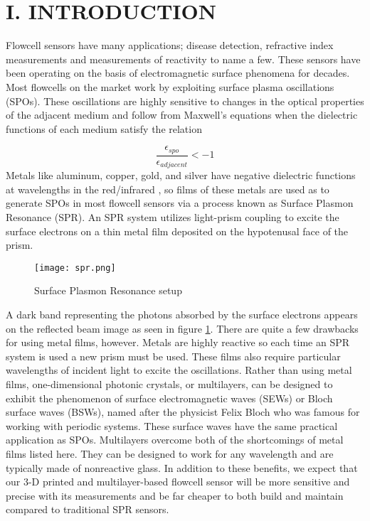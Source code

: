 \selectfont
{}
\section*{I. INTRODUCTION}
\begin{flushleft}
	\hspace{0.25in}
	Flowcell sensors have many applications; disease detection, refractive index measurements and measurements of reactivity to name a few. These sensors have been operating on the basis of electromagnetic surface phenomena for decades. Most flowcells on the market work by exploiting surface plasma oscillations (SPOs). These oscillations are highly sensitive to changes in the optical properties of the adjacent medium and follow from Maxwell's equations when the dielectric functions of each medium satisfy the relation \cite{JLTROB:1}

	\[
		\frac{\epsilon_{spo}}{\epsilon_{adjacent}} < -1
	\]
	\hspace{0.25in}
	Metals like aluminum, copper, gold, and silver have negative dielectric functions at wavelengths in the red/infrared \cite{}, so films of these metals are used as to generate SPOs in most flowcell sensors via a process known as Surface Plasmon Resonance (SPR). An SPR system utilizes light-prism coupling to excite the surface electrons on a thin metal film deposited on the hypotenusal face of the prism.
	\begin{figure}[h]
		\begin{center}
			\texttt{[image: spr.png]}
			\caption{Surface Plasmon Resonance setup}
			\label{fig:SPR}
		\end{center}
	\end{figure}
	A dark band representing the photons absorbed by the surface electrons appears on the reflected beam image as seen in figure \ref{fig:SPR}. There are quite a few drawbacks for using metal films, however. Metals are highly reactive so each time an SPR system is used a new prism must be used. These films also require particular wavelengths of incident light to excite the oscillations. Rather than using metal films, one-dimensional photonic crystals, or multilayers, can be designed to exhibit the phenomenon of surface electromagnetic waves (SEWs) or Bloch surface waves (BSWs), named after the physicist Felix Bloch who was famous for working with periodic systems. These surface waves have the same practical application as SPOs. Multilayers overcome both of the shortcomings of metal films listed here. They can be designed to work for any wavelength and are typically made of nonreactive glass. In addition to these benefits, we expect that our 3-D printed and multilayer-based flowcell sensor will be more sensitive and precise with its measurements and be far cheaper to both build and maintain compared to traditional SPR sensors.


\end{flushleft}
